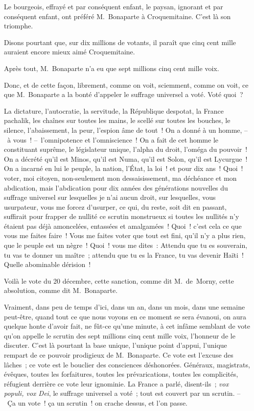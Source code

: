 \documentclass[french,twoside]{book} %
\begin{document}
Le bourgeois, effrayé et par conséquent enfant, le paysan, ignorant et par conséquent enfant, ont préféré M. Bonaparte à Croquemitaine. C’est là son triomphe.\par
Disons pourtant que, sur dix millions de votants, il paraît que cinq cent mille auraient encore mieux aimé Croquemitaine.\par
Après tout, M. Bonaparte n’a eu que sept millions cinq cent mille voix.\par
Donc, et de cette façon, librement, comme on voit, sciemment, comme on voit, ce que M. Bonaparte a la bonté d’appeler le suffrage universel a voté. Voté quoi ?\par
La dictature, l’autocratie, la servitude, la République despotat, la France pachalik, les chaînes sur toutes les mains, le scellé sur toutes les bouches, le silence, l’abaissement, la peur, l’espion âme de tout ! On a donné à un homme, – à vous ! – l’omnipotence et l’omniscience ! On a fait de cet homme le constituant suprême, le législateur unique, l’alpha du droit, l’oméga du pouvoir ! On a décrété qu’il est Minos, qu’il est Numa, qu’il est Solon, qu’il est Lycurgue ! On a incarné en lui le peuple, la nation, l’État, la loi ! et pour dix ans ! Quoi ! voter, moi citoyen, non-seulement mon dessaisissement, ma déchéance et mon abdication, mais l’abdication pour dix années des générations nouvelles du suffrage universel sur lesquelles je n’ai aucun droit, sur lesquelles, vous usurpateur, vous me forcez d’usurper, ce qui, du reste, soit dit en passant, suffirait pour frapper de nullité ce scrutin monstrueux si toutes les nullités n’y étaient pas déjà amoncelées, entassées et amalgamées ! Quoi ! c’est cela ce que vous me faites faire ! Vous me faites voter que tout est fini, qu’il n’y a plus rien, que le peuple est un nègre ! Quoi ! vous me dites : Attendu que tu es souverain, tu vas te donner un maître ; attendu que tu es la France, tu vas devenir Haïti ! Quelle abominable dérision !\par
Voilà le vote du 20 décembre, cette sanction, comme dit M. de Morny, cette absolution, comme dit M. Bonaparte.\par
Vraiment, dans peu de temps d’ici, dans un an, dans un mois, dans une semaine peut-être, quand tout ce que nous voyons en ce moment se sera évanoui, on aura quelque honte d’avoir fait, ne fût-ce qu’une minute, à cet infâme semblant de vote qu’on appelle le scrutin des sept millions cinq cent mille voix, l’honneur de le discuter. C’est là pourtant la base unique, l’unique point d’appui, l’unique rempart de ce pouvoir prodigieux de M. Bonaparte. Ce vote est l’excuse des lâches ; ce vote est le bouclier des consciences déshonorées. Généraux, magistrats, évêques, toutes les forfaitures, toutes les prévarications, toutes les complicités, réfugient derrière ce vote leur ignominie. La France a parlé, disent-ils ; \emph{vox populi, vox Dei}, le suffrage universel a voté ; tout est couvert par un scrutin. – Ça un vote ! ça un scrutin ! on crache dessus, et l’on passe.\par
\end{document}
